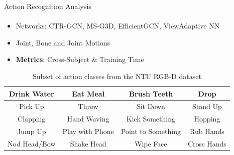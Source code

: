 \documentclass[aspectratio=169, xcolor=dvipsnames]{beamer}
\begin{document}
\begin{frame}{Action Recognition Analysis}
      \framesubtitle{}%
      
      \begin{itemize}
      \item Networks: CTR-GCN, MS-G3D, EfficientGCN, ViewAdaptive NN
      \item Joint, Bone and Joint Motions
      \item \textbf{Metrics}: Cross-Subject \& Training Time
      \end{itemize}
      \vfill
      \begin{table}[ht!]
      \centering
      {\footnotesize
      \begin{tabular}{ |c|c|c|c| } 
              \hline
              Drink Water & Eat Meal & Brush Teeth & Drop \\ 
              \hline
              Pick Up & Throw & Sit Down & Stand Up \\ 
              \hline
              Clapping & Hand Waving & Kick Something & Hopping \\ 
              \hline
              Jump Up & Play with Phone & Point to Something & Rub Hands \\
              \hline
              Nod Head/Bow & Shake Head & Wipe Face & Cross Hands \\
              \hline
      \end{tabular}
      }
      \caption{Subset of action classes from the NTU RGB-D dataset}
      \end{table}
\end{frame}
\end{document}
